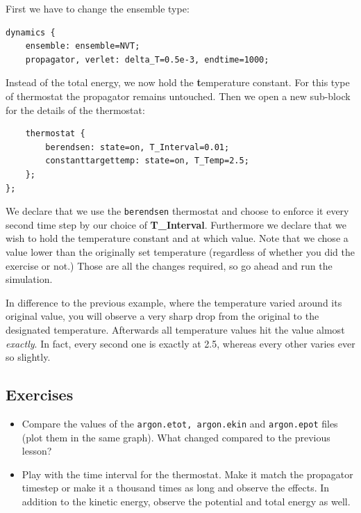 First we have to change the ensemble type:
\begin{lstlisting}
dynamics {
    ensemble: ensemble=NVT;
    propagator, verlet: delta_T=0.5e-3, endtime=1000;
\end{lstlisting}
Instead of the total energy, we now hold the \textbf{t}emperature constant. For this type of thermostat the propagator remains untouched.
Then we open a new sub-block for the details of the thermostat:
\begin{lstlisting}
    thermostat {
        berendsen: state=on, T_Interval=0.01;
        constanttargettemp: state=on, T_Temp=2.5;
    };
};
\end{lstlisting}
We declare that we use the \texttt{berendsen} thermostat and choose to enforce it every second time step by our choice of \textbf{T\_Interval}.
Furthermore we declare that we wish to hold the temperature constant and at which value. Note that we chose a value lower than
the originally set temperature (regardless of whether you did the exercise or not.)
Those are all the changes required, so go ahead and run the simulation. 

In difference to the previous example, where the temperature varied around its original value, you will observe a very sharp drop
from the original to the designated temperature. Afterwards all temperature values hit the value almost \textit{exactly}. In
fact, every second one is exactly at 2.5, whereas every other varies ever so slightly. 

\subsection{Exercises}
\begin{itemize}
\item Compare the values of the \texttt{argon.etot, argon.ekin} and \texttt{argon.epot} files (plot them in the same graph). What changed compared to the previous lesson?
\item Play with the time interval for the thermostat. Make it match the propagator timestep or make it a thousand times as long and observe the effects. In addition to the kinetic energy, observe the potential and total energy as well.
\end{itemize}

